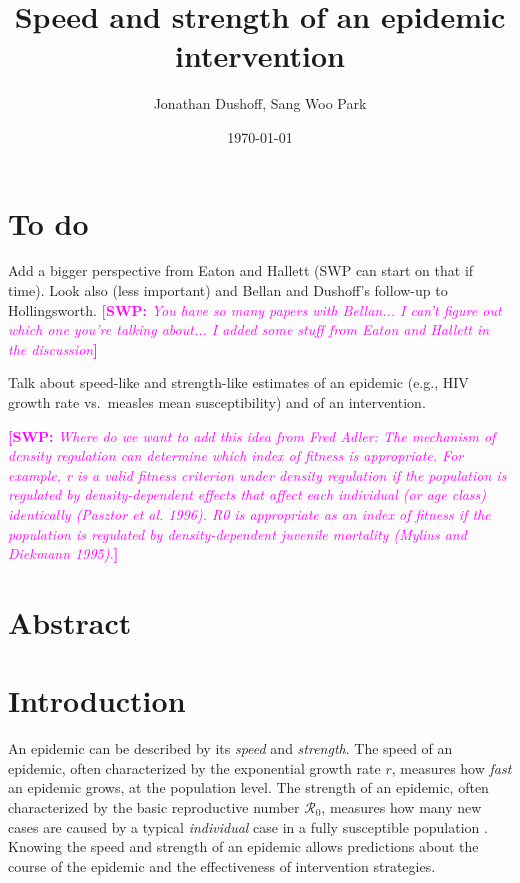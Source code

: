\documentclass[12pt]{article}
\title{Speed and strength of an epidemic intervention}
\author{Jonathan Dushoff, Sang Woo Park}
\date{\today}
\newcommand{\comment}[3]{\textcolor{#1}{\textbf{[#2: }\textit{#3}\textbf{]}}}
\newcommand{\swp}[1]{\comment{magenta}{SWP}{#1}}
\newcommand{\RR}{\ensuremath{{\mathcal R}}}
\begin{document}
\maketitle

\section*{To do}

Add a bigger perspective from Eaton and Hallett (SWP can start on that if time). Look also (less important) and Bellan and Dushoff's follow-up to Hollingsworth. \swp{You have so many papers with Bellan... I can't figure out which one you're talking about... I added some stuff from Eaton and Hallett in the discussion}

Talk about speed-like and strength-like estimates of an epidemic (e.g., HIV growth rate vs.~measles mean susceptibility) and of an intervention.

\swp{Where do we want to add this idea from Fred Adler: The mechanism of density regulation can determine which index of fitness
is appropriate. For example, r is a valid fitness criterion under
density regulation if the population is regulated by density-dependent
effects that affect each individual (or age class) identically (Pasztor
et al. 1996). R0 is appropriate as an index of fitness if the population
is regulated by density-dependent juvenile mortality (Mylius and
Diekmann 1995).}

\section*{Abstract}



\section{Introduction}

An epidemic can be described by its \emph{speed} and \emph{strength}.
The speed of an epidemic, often characterized by the exponential growth rate $r$, measures how \emph{fast} an epidemic grows, at the population level. 
The strength of an epidemic, often characterized by the basic reproductive number $\RR_0$, measures how many new cases are caused by a typical \emph{individual} case in a fully susceptible population \citep{anderson1991infectious, diekmann1990definition}.
Knowing the speed and strength of an epidemic allows predictions about the course of the epidemic and the effectiveness of intervention strategies.
\end{document}
